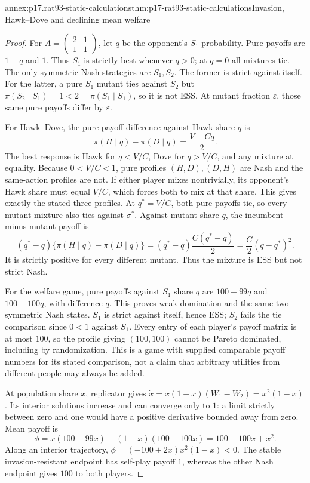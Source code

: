 \begin{annexitem}{annex:p17.rat93-static-calculations}{thm:p17-rat93-static-calculations}{Invasion, Hawk--Dove and declining mean welfare}
\begin{proof}
For \(A=\left(\begin{smallmatrix}2&1\\1&1\end{smallmatrix}\right)\),
let \(q\) be the opponent's \(S_1\) probability. Pure payoffs are
\(1+q\) and \(1\). Thus \(S_1\) is strictly best whenever
\(q>0\); at \(q=0\) all mixtures tie. The only symmetric Nash
strategies are \(S_1,S_2\). The former is strict against itself.
For the latter, a pure \(S_1\) mutant ties against \(S_2\) but
\(\pi(S_2\mid S_1)=1<2=\pi(S_1\mid S_1)\), so it is not ESS.
At mutant fraction \(\varepsilon\), those same pure payoffs differ
by \(\varepsilon\).

For Hawk--Dove, the pure payoff difference against Hawk share \(q\) is
\[
 \pi(H\mid q)-\pi(D\mid q)=\frac{V-Cq}{2}.
\]
The best response is Hawk for \(q<V/C\), Dove for \(q>V/C\), and
any mixture at equality. Because \(0<V/C<1\), pure profiles
\((H,D),(D,H)\) are Nash and the same-action profiles are not.
If either player mixes nontrivially, its opponent's Hawk share must
equal \(V/C\), which forces both to mix at that share. This gives
exactly the stated three profiles.
At \(q^*=V/C\), both pure payoffs tie, so every mutant mixture
also ties against \(\sigma^*\). Against mutant share \(q\),
the incumbent-minus-mutant payoff is
\[
 (q^*-q)\{\pi(H\mid q)-\pi(D\mid q)\}
       =(q^*-q)\frac{C(q^*-q)}2
       =\frac C2(q-q^*)^2.
\]
It is strictly positive for every different mutant. Thus the mixture
is ESS but not strict Nash.

For the welfare game, pure payoffs against \(S_1\) share \(q\)
are \(100-99q\) and \(100-100q\), with difference \(q\).
This proves weak domination and the same two symmetric Nash states.
\(S_1\) is strict against itself, hence ESS; \(S_2\) fails the
tie comparison since \(0<1\) against \(S_1\).
Every entry of each player's payoff matrix is at most \(100\), so
the profile giving \((100,100)\) cannot be Pareto dominated,
including by randomization. This is a game with supplied comparable
payoff numbers for its stated comparison, not a claim that arbitrary
utilities from different people may always be added.

At population share \(x\), replicator gives
\(\dot x=x(1-x)(W_1-W_2)=x^2(1-x)\). Its interior solutions
increase and can converge only to \(1\): a limit strictly between
zero and one would have a positive derivative bounded away from zero.
Mean payoff is
\[
 \phi=x(100-99x)+(1-x)(100-100x)=100-100x+x^2.
\]
Along an interior trajectory,
\(\dot\phi=(-100+2x)x^2(1-x)<0\).
The stable invasion-resistant endpoint has self-play payoff \(1\),
whereas the other Nash endpoint gives \(100\) to both players.
\end{proof}
\end{annexitem}

